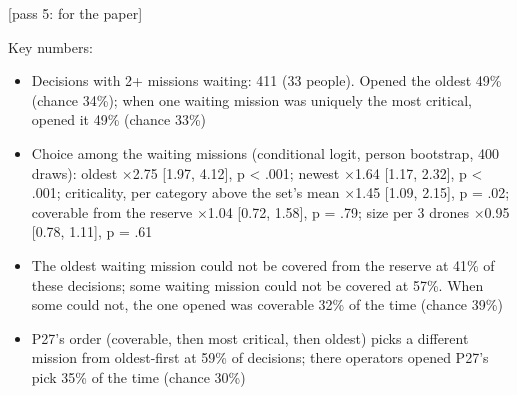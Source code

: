 \begin{options}

 {\footnotesize [pass 5: for the paper]}

\noindent Key numbers:\begin{itemize}[leftmargin=1.2em,itemsep=0pt]\footnotesize
\item Decisions with 2+ missions waiting: 411 (33 people). Opened the oldest 49\% (chance 34\%); when one waiting mission was uniquely the most critical, opened it 49\% (chance 33\%)
\item Choice among the waiting missions (conditional logit, person bootstrap, 400 draws): oldest $\times$2.75 [1.97, 4.12], p < .001; newest $\times$1.64 [1.17, 2.32], p < .001; criticality, per category above the set's mean $\times$1.45 [1.09, 2.15], p = .02; coverable from the reserve $\times$1.04 [0.72, 1.58], p = .79; size per 3 drones $\times$0.95 [0.78, 1.11], p = .61
\item The oldest waiting mission could not be covered from the reserve at 41\% of these decisions; some waiting mission could not be covered at 57\%. When some could not, the one opened was coverable 32\% of the time (chance 39\%)
\item P27's order (coverable, then most critical, then oldest) picks a different mission from oldest-first at 59\% of decisions; there operators opened P27's pick 35\% of the time (chance 30\%)
\end{itemize}
\end{options}

\clearpage
